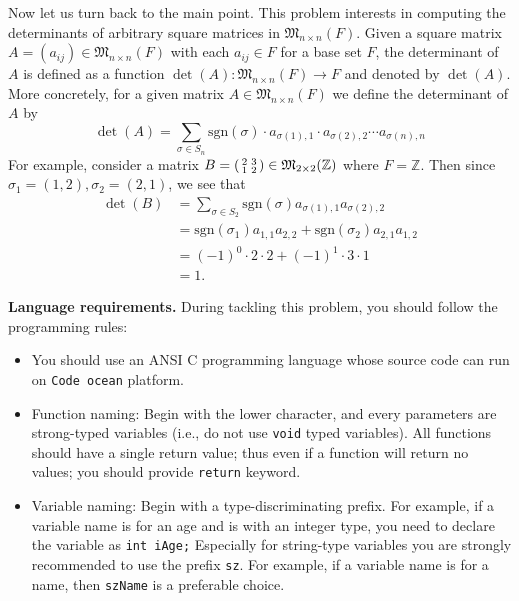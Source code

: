 \documentclass{article}
\newcommand{\Z}{\mathbb{Z}}
\newcommand{\M}[2]{{\mathfrak{M}_{#1\times #2}}}
\newcommand{\sgn}{{\mathrm{sgn}}}
\newenvironment{psmallmatrix}
  {\left(\begin{smallmatrix}}
  {\end{smallmatrix}\right)}
\begin{document}
Now let us turn back to the main point. This problem interests in computing the determinants of arbitrary square matrices 
in $\M{n}{n}(F)$.
Given a square matrix $A=(a_{ij})\in\M{n}{n}(F)$ with each $a_{ij}\in F$ for a base set $F$, 
the determinant of $A$ is defined as a function $\det(A):\M{n}{n}(F)\rightarrow F$ and denoted by $\det(A)$.
More concretely,  for a given matrix $A\in\M{n}{n}(F)$ we define the determinant of $A$  by 
\begin{equation*}
\det(A)=\sum_{\sigma\in S_n}\sgn(\sigma)\cdot a_{\sigma(1),1}\cdot a_{\sigma(2),2}\cdots a_{\sigma(n),n}
\end{equation*}
For example, consider a matrix $B=\begin{psmallmatrix} 2 & 3 \\ 1 & 2 \end{psmallmatrix}\in\M{2}{2}(\Z)$
where $F=\Z$. 
Then since $\sigma_1=(1,2),\sigma_2=(2,1)$, we see that 
\begin{align*}
\det(B)&=\sum_{\sigma\in S_2}\sgn(\sigma)a_{\sigma(1),1}a_{\sigma(2),2}\\
	&=\sgn(\sigma_1)a_{1,1}a_{2,2}+\sgn(\sigma_2)a_{2,1}a_{1,2}\\
	&=(-1)^0\cdot 2\cdot 2+(-1)^1\cdot 3\cdot 1\\
	&=1.
\end{align*}

\bigskip
\noindent\textbf{Language requirements. }%
During tackling this problem, you should follow the programming rules:
\begin{itemize}
\item You should use an ANSI C programming language whose source code can run on \texttt{Code ocean} platform. 
\item Function naming: Begin with the lower character, and every parameters are strong-typed variables (i.e., do not use \texttt{void} typed variables).
	All functions should have a single return value; thus even if a function will return no values; you should provide \texttt{return} keyword.
\item Variable naming: Begin with a type-discriminating prefix. For example, if a variable name is for an age and is with an integer type,
	you need to declare the variable as \texttt{int iAge;}  Especially for string-type variables you are strongly recommended to use the prefix \texttt{sz}.
	For example, if a variable name is for a name, then \texttt{szName} is a preferable choice.
\end{itemize}
\end{document}
